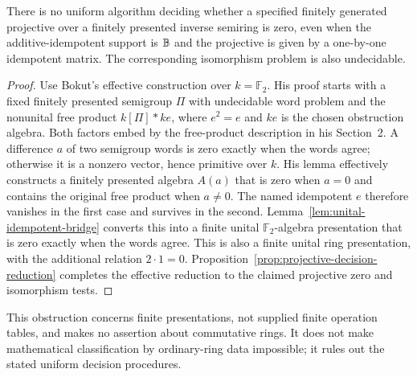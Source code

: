 \begin{corollary}\label{cor:projective-undecidable}
There is no uniform algorithm deciding whether a specified finitely
generated projective over a finitely presented inverse semiring is
zero, even when the additive-idempotent support is $\mathbb B$ and the
projective is given by a one-by-one idempotent matrix. The corresponding
isomorphism problem is also undecidable.
\end{corollary}
\begin{proof}
Use Bokut's effective construction
\cite[Section~3, p.~139; Section~4, pp.~142--143]{Bokut} over
$k=\mathbb F_2$. His proof starts with a fixed finitely presented
semigroup $\Pi$ with undecidable word problem and the nonunital free
product $k[\Pi]*ke$, where $e^2=e$ and $ke$ is the chosen
obstruction algebra. Both factors embed by the free-product
description in his Section~2. A difference $a$ of two semigroup
words is zero exactly when the words agree; otherwise it is a
nonzero vector, hence primitive over $k$. His lemma effectively
constructs a finitely presented algebra $A(a)$ that is zero when
$a=0$ and contains the original free product when $a\ne0$.
The named idempotent $e$ therefore vanishes in the first case and
survives in the second. Lemma~\ref{lem:unital-idempotent-bridge}
converts this into a finite unital $\mathbb F_2$-algebra presentation
that is zero exactly when the words agree. This is also a finite
unital ring presentation, with the additional relation $2\cdot1=0$.
Proposition~\ref{prop:projective-decision-reduction} completes the
effective reduction to the claimed projective zero and isomorphism
tests.
\end{proof}
This obstruction concerns finite presentations, not supplied finite
operation tables, and makes no assertion about commutative rings.
It does not make mathematical classification by ordinary-ring data
impossible; it rules out the stated uniform decision procedures.
